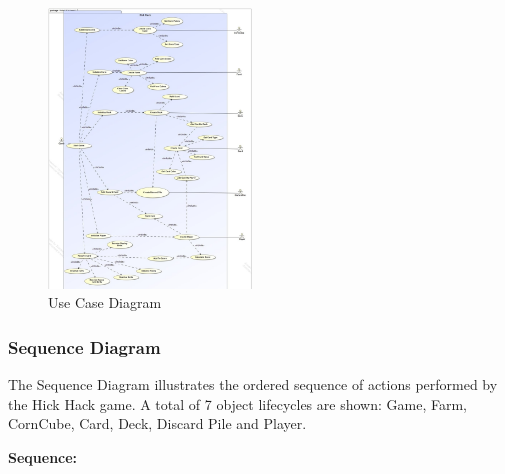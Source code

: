 \documentclass[conference]{IEEEtran}
\begin{document}
\begin{figure}[h!]
    \centering
    \includegraphics[width=0.48\textwidth]{img/Java Board Game Use Case Diagram.jpeg} %
    \caption{Use Case Diagram}
    \label{fig:use-case-diagram}
\end{figure}


\subsubsection{Sequence Diagram}



The Sequence Diagram illustrates the ordered sequence of actions performed by the Hick Hack game. A total of 7 object lifecycles are shown: Game, Farm, CornCube, Card, Deck, Discard Pile and Player.

\textbf{Sequence:}
\end{document}
